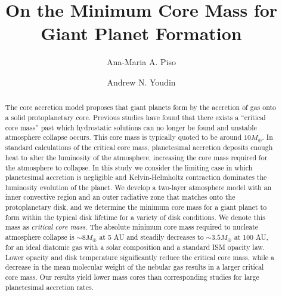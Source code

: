 \documentclass[apj]{emulateapj}
\begin{document}



\title{On the Minimum Core Mass for Giant Planet Formation}
\author{Ana-Maria A. Piso}
\author{Andrew N. Youdin}

\begin{abstract}
The core accretion model proposes that giant planets form by the accretion of gas onto a solid protoplanetary core. Previous studies have found that there exists a ``critical core mass'' past which hydrostatic solutions can no longer be found and unstable atmosphere collapse occurs. This core mass is typically quoted to be around $10 M_{\oplus}$. In standard calculations of the critical core mass, planetesimal accretion deposits enough heat to alter the luminosity of the atmosphere, increasing the core mass required for the atmosphere to collapse. In this study we consider the limiting case in which planetesimal accretion is negligible and Kelvin-Helmholtz contraction dominates the luminosity evolution of the planet. We develop a two-layer atmosphere model with an inner convective region and an outer radiative zone that matches onto the protoplanetary disk, and we determine the minimum core mass for a giant planet to form within the typical disk lifetime for a variety of disk conditions. We denote this mass as  \textit{critical core mass}. The absolute minimum core mass required to nucleate atmosphere collapse is $\sim 8 M_{\oplus}$ at 5 AU and steadily decreases to $\sim 3.5 M_{\oplus}$ at 100 AU, for an ideal diatomic gas with a solar composition and a standard ISM opacity law. Lower opacity and disk temperature significantly reduce the critical core mass, while a decrease in the mean molecular weight of the nebular gas results in a larger critical core mass. Our results yield lower mass cores than corresponding studies for large planetesimal accretion rates. %


\end{abstract}
\end{document}
